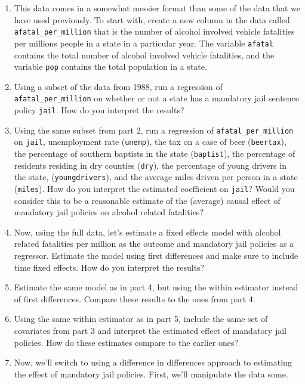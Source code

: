 \documentclass[
  letterpaper,
  DIV=11,
  numbers=noendperiod]{scrreprt}
\begin{document}
\begin{enumerate}
\def\labelenumi{\arabic{enumi}.}
\item
  This data comes in a somewhat messier format than some of the data
  that we have used previously. To start with, create a new column in
  the data called \texttt{afatal\_per\_million} that is the number of
  alcohol involved vehicle fatalities per millions people in a state in
  a particular year. The variable \texttt{afatal} contains the total
  number of alcohol involved vehicle fatalities, and the variable
  \texttt{pop} contains the total population in a state.
\item
  Using a subset of the data from 1988, run a regression of
  \texttt{afatal\_per\_million} on whether or not a state has a
  mandatory jail sentence policy \texttt{jail}. How do you interpret the
  results?
\item
  Using the same subset from part 2, run a regression of
  \texttt{afatal\_per\_million} on \texttt{jail}, unemployment rate
  (\texttt{unemp}), the tax on a case of beer (\texttt{beertax}), the
  percentage of southern baptists in the state (\texttt{baptist}), the
  percentage of residents residing in dry counties (\texttt{dry}), the
  percentage of young drivers in the state, (\texttt{youngdrivers}), and
  the average miles driven per person in a state (\texttt{miles}). How
  do you interpret the estimated coefficient on \texttt{jail}? Would you
  consider this to be a reasonable estimate of the (average) causal
  effect of mandatory jail policies on alcohol related fatalities?
\item
  Now, using the full data, let's estimate a fixed effects model with
  alcohol related fatalities per million as the outcome and mandatory
  jail policies as a regressor. Estimate the model using first
  differences and make sure to include time fixed effects. How do you
  interpret the results?
\item
  Estimate the same model as in part 4, but using the within estimator
  instead of first differences. Compare these results to the ones from
  part 4.
\item
  Using the same within estimator as in part 5, include the same set of
  covariates from part 3 and interpret the estimated effect of mandatory
  jail policies. How do these estimates compare to the earlier ones?
\item
  Now, we'll switch to using a difference in differences approach to
  estimating the effect of mandatory jail policies. First, we'll
  manipulate the data some.


\end{enumerate}
\end{document}
